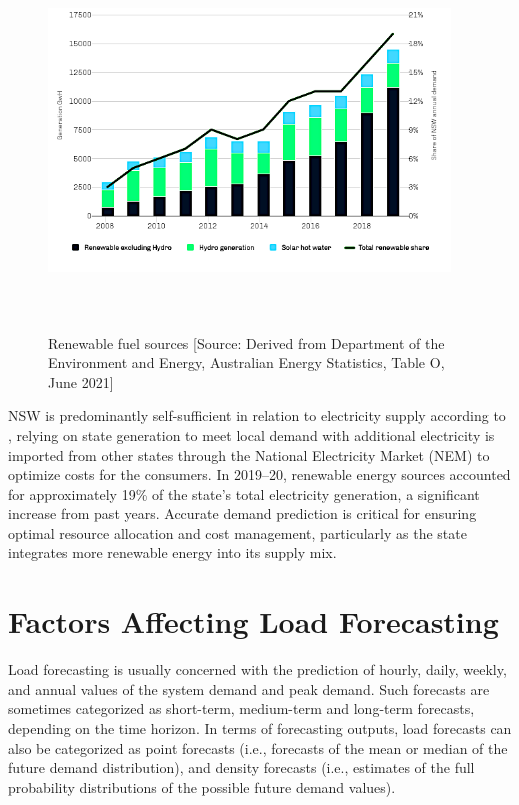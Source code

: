 \documentclass[mstat,12pt]{unswthesis}
\begin{document}
\begin{figure}[H]
\centering
\includegraphics[width=0.95\textwidth,height=10cm]{renewable_fuel_sources_chart.png}
\caption{Renewable fuel sources [Source:
Derived from Department of the Environment and Energy, Australian Energy Statistics, Table O, June 2021]}\label{renewable}
\end{figure}

NSW is predominantly self-sufficient in relation to electricity supply
according to \linebreak \cite{nsw_epa_2021_energy_consumption}, relying
on state generation to meet local demand with additional electricity is
imported from other states through the National Electricity Market (NEM)
to optimize costs for the consumers. In 2019--20, renewable energy
sources accounted for approximately 19\% of the state's total
electricity generation, a significant increase from past years. Accurate
demand prediction is critical for ensuring optimal resource allocation
and cost management, particularly as the state integrates more renewable
energy into its supply mix.

\section{Factors Affecting Load
Forecasting}\label{factors-affecting-load-forecasting}

Load forecasting is usually concerned with the prediction of hourly,
daily, weekly, and annual values of the system demand and peak demand.
Such forecasts are sometimes categorized as short-term, medium-term and
long-term forecasts, depending on the time horizon. In terms of
forecasting outputs, load forecasts can also be categorized as point
forecasts (i.e., forecasts of the mean or median of the future demand
distribution), and density forecasts (i.e., estimates of the full
probability distributions of the possible future demand values).
\end{document}
